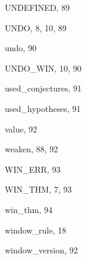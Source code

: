 \begin{theindex}
  \indexspace

  \item {\ptt UNDEFINED}, 89
  \item {\ptt UNDO}, 8, 10, 89
  \item {\ptt undo}, 90
  \item {\ptt UNDO\_WIN}, 10, 90
  \item {\ptt used\_conjectures}, 91
  \item {\ptt used\_hypotheses}, 91

  \indexspace

  \item {\ptt value}, 92

  \indexspace

  \item {\ptt weaken}, 88, 92
  \item {\ptt WIN\_ERR}, 93
  \item {\ptt WIN\_THM}, 7, 93
  \item {\ptt win\_thm}, 94
  \item {\ptt window\_rule}, 18
  \item {\ptt window\_version}, 92

\end{theindex}

